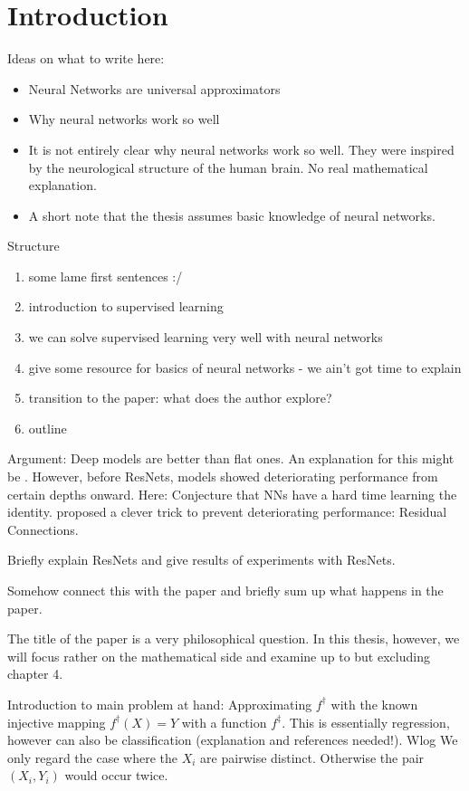 \section{Introduction}

Ideas on what to write here:
\begin{itemize}
	\item Neural Networks are universal approximators
	\item Why neural networks work so well \cite{lin17}
	\item It is not entirely clear why neural networks work so well. 
	They were inspired by the neurological structure of the human brain.
	No real mathematical explanation.
	\item A short note that the thesis assumes basic knowledge of neural networks.
\end{itemize}
Structure
\begin{enumerate}
	\item some lame first sentences :/
	\item introduction to supervised learning
	\item we can solve supervised learning very well with neural networks
	\item give some resource for basics of neural networks - we ain't got time to explain
	\item transition to the paper: what does the author explore?
	\item outline
\end{enumerate}

Argument:
Deep models are better than flat ones. An explanation for this might be \cite{lin17}.
However, before ResNets, models showed deteriorating performance from certain depths onward.
Here: Conjecture that NNs have a hard time learning the identity.
\cite{he16} proposed a clever trick to prevent deteriorating performance:
Residual Connections.

Briefly explain ResNets and give results of experiments with ResNets.

Somehow connect this with the paper and briefly sum up what happens in the paper.

The title of the paper is a very philosophical question.
In this thesis, however, we will focus rather on the mathematical side and examine \cite{owhadi20} up to but excluding chapter 4.

Introduction to main problem at hand:
Approximating $f^\dagger$ with the known injective mapping $f^\dagger(X) = Y$ with a function $f^\ddagger$.
This is essentially regression, however can also be classification (explanation and references needed!).
Wlog We only regard the case where the $X_i$ are pairwise distinct.
Otherwise the pair $(X_i, Y_i)$ would occur twice.

